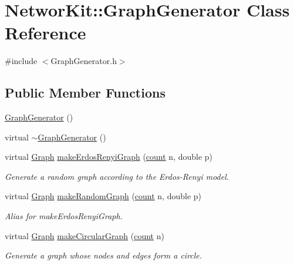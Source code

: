 \hypertarget{class_networ_kit_1_1_graph_generator}{\section{Networ\-Kit\-:\-:Graph\-Generator Class Reference}
\label{class_networ_kit_1_1_graph_generator}
}


{\ttfamily \#include $<$Graph\-Generator.\-h$>$}

\subsection*{Public Member Functions}
\begin{DoxyCompactItemize}
\item 
\hyperlink{class_networ_kit_1_1_graph_generator_aca81cef9e25ef06e72d5286ed674a75f}{Graph\-Generator} ()
\item 
virtual \hyperlink{class_networ_kit_1_1_graph_generator_a9b8b2a73a8be7bbe8c481335be21ad58}{$\sim$\-Graph\-Generator} ()
\item 
virtual \hyperlink{class_networ_kit_1_1_graph}{Graph} \hyperlink{class_networ_kit_1_1_graph_generator_aba5717e858cde8d115606c821d032961}{make\-Erdos\-Renyi\-Graph} (\hyperlink{namespace_networ_kit_a76b399edfa50ae72e4aa86007aaa800a}{count} n, double p)
\begin{DoxyCompactList}\small\item\em Generate a random graph according to the Erdos-\/\-Renyi model. \end{DoxyCompactList}\item 
virtual \hyperlink{class_networ_kit_1_1_graph}{Graph} \hyperlink{class_networ_kit_1_1_graph_generator_af518e37d5588aa84c51cbca117340dc4}{make\-Random\-Graph} (\hyperlink{namespace_networ_kit_a76b399edfa50ae72e4aa86007aaa800a}{count} n, double p)
\begin{DoxyCompactList}\small\item\em Alias for make\-Erdos\-Renyi\-Graph. \end{DoxyCompactList}\item 
virtual \hyperlink{class_networ_kit_1_1_graph}{Graph} \hyperlink{class_networ_kit_1_1_graph_generator_a7f8a211ff09c119c448c58a2fd58cda5}{make\-Circular\-Graph} (\hyperlink{namespace_networ_kit_a76b399edfa50ae72e4aa86007aaa800a}{count} n)
\begin{DoxyCompactList}\small\item\em Generate a graph whose nodes and edges form a circle. \end{DoxyCompactList}\item 

\end{DoxyCompactItemize}
